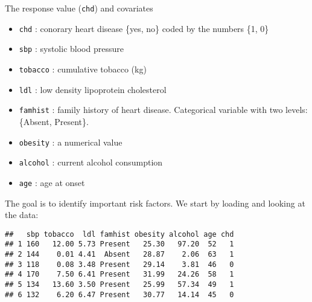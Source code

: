 \documentclass[10pt,ignorenonframetext,]{beamer}
\newenvironment{Shaded}{\begin{snugshade}}{\end{snugshade}}
\newcommand{\KeywordTok}[1]{\textcolor[rgb]{0.13,0.29,0.53}{\textbf{#1}}}
\newcommand{\NormalTok}[1]{#1}
\newcommand{\OperatorTok}[1]{\textcolor[rgb]{0.81,0.36,0.00}{\textbf{#1}}}
\newcommand{\StringTok}[1]{\textcolor[rgb]{0.31,0.60,0.02}{#1}}
\providecommand{\tightlist}{%
  \setlength{\itemsep}{0pt}\setlength{\parskip}{0pt}}
\begin{document}
\begin{frame}[fragile]

The response value (\texttt{chd}) and covariates

\begin{itemize}
\tightlist
\item
  \texttt{chd} : conorary heart disease \{yes, no\} coded by the numbers
  \{1, 0\}
\item
  \texttt{sbp} : systolic blood pressure\\
\item
  \texttt{tobacco} : cumulative tobacco (kg)\\
\item
  \texttt{ldl} : low density lipoprotein cholesterol
\item
  \texttt{famhist} : family history of heart disease. Categorical
  variable with two levels: \{Absent, Present\}.
\item
  \texttt{obesity} : a numerical value
\item
  \texttt{alcohol} : current alcohol consumption
\item
  \texttt{age} : age at onset
\end{itemize}

The goal is to identify important risk factors. We start by loading and
looking at the data:

\end{frame}

\begin{frame}[fragile]

\footnotesize

\begin{Shaded}
\end{Shaded}

\begin{verbatim}
##   sbp tobacco  ldl famhist obesity alcohol age chd
## 1 160   12.00 5.73 Present   25.30   97.20  52   1
## 2 144    0.01 4.41  Absent   28.87    2.06  63   1
## 3 118    0.08 3.48 Present   29.14    3.81  46   0
## 4 170    7.50 6.41 Present   31.99   24.26  58   1
## 5 134   13.60 3.50 Present   25.99   57.34  49   1
## 6 132    6.20 6.47 Present   30.77   14.14  45   0
\end{verbatim}

\normalsize

\end{frame}
\end{document}
